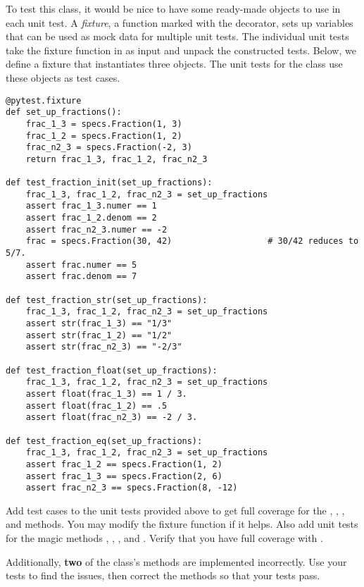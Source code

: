 To test this class, it would be nice to have some ready-made  objects to use in each unit test.
A \emph{fixture}, a function marked with the  decorator, sets up variables that can be used as mock data for multiple unit tests.
The individual unit tests take the fixture function in as input and unpack the constructed tests.
Below, we define a fixture that instantiates three  objects.
The unit tests for the  class use these objects as test cases.

\begin{lstlisting}
@pytest.fixture
def set_up_fractions():
    frac_1_3 = specs.Fraction(1, 3)
    frac_1_2 = specs.Fraction(1, 2)
    frac_n2_3 = specs.Fraction(-2, 3)
    return frac_1_3, frac_1_2, frac_n2_3

def test_fraction_init(set_up_fractions):
    frac_1_3, frac_1_2, frac_n2_3 = set_up_fractions
    assert frac_1_3.numer == 1
    assert frac_1_2.denom == 2
    assert frac_n2_3.numer == -2
    frac = specs.Fraction(30, 42)                   # 30/42 reduces to 5/7.
    assert frac.numer == 5
    assert frac.denom == 7

def test_fraction_str(set_up_fractions):
    frac_1_3, frac_1_2, frac_n2_3 = set_up_fractions
    assert str(frac_1_3) == "1/3"
    assert str(frac_1_2) == "1/2"
    assert str(frac_n2_3) == "-2/3"

def test_fraction_float(set_up_fractions):
    frac_1_3, frac_1_2, frac_n2_3 = set_up_fractions
    assert float(frac_1_3) == 1 / 3.
    assert float(frac_1_2) == .5
    assert float(frac_n2_3) == -2 / 3.

def test_fraction_eq(set_up_fractions):
    frac_1_3, frac_1_2, frac_n2_3 = set_up_fractions
    assert frac_1_2 == specs.Fraction(1, 2)
    assert frac_1_3 == specs.Fraction(2, 6)
    assert frac_n2_3 == specs.Fraction(8, -12)
\end{lstlisting}

\begin{problem}
Add test cases to the unit tests provided above to get full coverage for the , , , and  methods.
You may modify the fixture function if it helps.
Also add unit tests for the magic methods , , , and .
Verify that you have full coverage with .

Additionally, \textbf{two} of the  class's methods are implemented incorrectly.
Use your tests to find the issues, then correct the methods so that your tests pass.
\end{problem}

